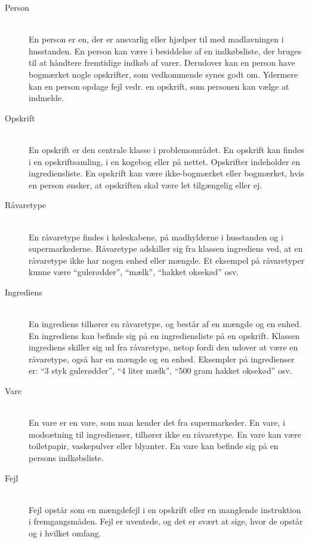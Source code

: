 \begin{description}
\item[Person] \hfill \\
En person er en, der er ansvarlig eller hjælper til med madlavningen i husstanden. En person kan være i besiddelse af en indkøbsliste, der bruges til at håndtere fremtidige indkøb af varer. Derudover kan en person have bogmærket nogle opskrifter, som vedkommende synes godt om. Ydermere kan en person opdage fejl vedr. en opskrift, som personen kan vælge at indmelde.

\item[Opskrift] \hfill \\
En opskrift er den centrale klasse i problemområdet. En opskrift kan findes i en opskriftsamling, i en kogebog eller på nettet. Opskrifter indeholder en ingrediensliste. En opskrift kan være ikke-bogmærket eller bogmærket, hvis en person ønsker, at opskriften skal være let tilgængelig eller ej.

\item[Råvaretype] \hfill \\
En råvaretype findes i køleskabene, på madhylderne i husstanden og i supermarkederne. Råvaretype adskiller sig fra klassen ingrediens ved, at en råvaretype ikke har nogen enhed eller mængde. Et eksempel på råvaretyper kunne være ``gulerødder'', ``mælk'', ``hakket oksekød'' osv. 

\item[Ingrediens] \hfill \\ 
En ingrediens tilhører en råvaretype, og består af en mængde og en enhed. En ingrediens kan befinde sig på en ingrediensliste på en opskrift. Klassen ingrediens skiller sig ud fra råvaretype, netop fordi den udover at være en råvaretype, også har en mængde og en enhed. Eksempler på ingredienser er: ``3 styk gulerødder'', ``4 liter mælk'', ``500 gram hakket oksekød'' osv.

\item[Vare] \hfill \\
En vare er en vare, som man kender det fra supermarkeder. En vare, i modsætning til ingredienser, tilhører ikke en råvaretype. En vare kan \fx være toiletpapir, vaskepulver eller blyanter. En vare kan befinde sig på en persons indkøbsliste.

\item[Fejl] \hfill \\
Fejl opstår som \fx en mængdefejl i en opskrift eller en manglende instruktion i fremgangsmåden. Fejl er uventede, og det er svært at sige, hvor de opstår og i hvilket omfang.

\end{description}


